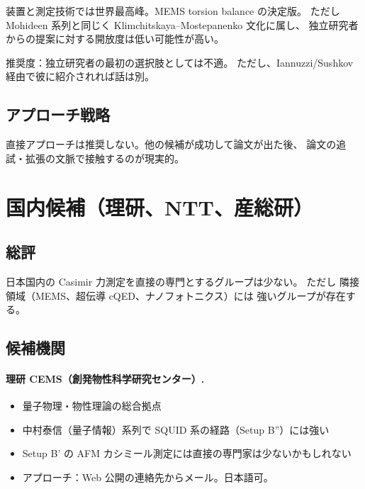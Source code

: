 \documentclass[11pt,a4paper]{article}
\def\textbf#1{#1}%
\begin{document}
\textbf{装置と測定技術では世界最高峰}。MEMS torsion balance の決定版。
ただし Mohideen 系列と同じく Klimchitskaya--Mostepanenko 文化に属し、
\textbf{独立研究者からの提案に対する開放度は低い可能性が高い}。

\textbf{推奨度}：独立研究者の最初の選択肢としては不適。
ただし、Iannuzzi/Sushkov 経由で彼に紹介されれば話は別。

\subsection{アプローチ戦略}

\textbf{直接アプローチは推奨しない}。他の候補が成功して論文が出た後、
論文の追試・拡張の文脈で接触するのが現実的。

\newpage

\section{国内候補（理研、NTT、産総研）}

\subsection{総評}

日本国内の Casimir 力測定を直接の専門とするグループは少ない。
ただし \textbf{隣接領域}（MEMS、超伝導 cQED、ナノフォトニクス）には
強いグループが存在する。

\subsection{候補機関}

\paragraph{理研 CEMS（創発物性科学研究センター）.}
\begin{itemize}
\item 量子物理・物性理論の総合拠点
\item 中村泰信（量子情報）系列で SQUID 系の経路（Setup B''）には強い
\item Setup B' の AFM カシミール測定には直接の専門家は少ないかもしれない
\item アプローチ：Web 公開の連絡先からメール。日本語可。
\end{itemize}
\end{document}
